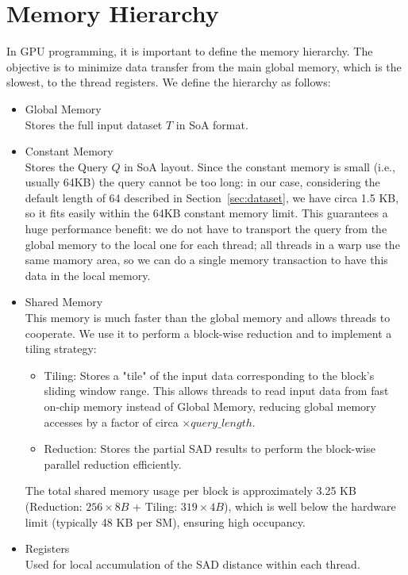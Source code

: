 \section{Memory Hierarchy}
\label{sec:par_memory}
In GPU programming, it is important to define the memory hierarchy. The objective is to minimize data transfer from the main global memory, which is the slowest, to the thread registers. We define the hierarchy as follows:
\begin{itemize}
    \item Global Memory \\
        Stores the full input dataset $T$ in SoA format.
    \item Constant Memory \\
        Stores the Query $Q$ in SoA layout. Since the constant memory is small (i.e., usually 64KB) the query cannot be too long: in our case, considering the default length of 64 described in Section~\ref{sec:dataset}, we have circa 1.5 KB, so it fits easily within the 64KB constant memory limit. This guarantees a huge performance benefit: we do not have to transport the query from the global memory to the local one for each thread; all threads in a warp use the same mamory area, so we can do a single memory transaction to have this data in the local memory.
    \item Shared Memory \\
        This memory is much faster than the global memory and allows threads to cooperate. We use it to perform a block-wise reduction and to implement a tiling strategy:
        \begin{itemize}
            \item Tiling: Stores a "tile" of the input data corresponding to the block's sliding window range. This allows threads to read input data from fast on-chip memory instead of Global Memory, reducing global memory accesses by a factor of circa $\times query\_length$.
            \item Reduction: Stores the partial SAD results to perform the block-wise parallel reduction efficiently.
        \end{itemize}
        The total shared memory usage per block is approximately 3.25 KB (Reduction: $256 \times 8B$ + Tiling: $319 \times 4B$), which is well below the hardware limit (typically 48 KB per SM), ensuring high occupancy.
    \item Registers \\
        Used for local accumulation of the SAD distance within each thread.
\end{itemize}

